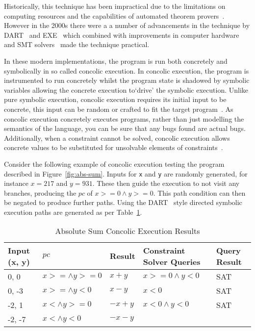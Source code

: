 \documentclass[]{final_report}
\begin{document}
Historically, this technique has been impractical due to the limitations on computing resources and the capabilities of automated theorem provers~\cite{king1976symbolic}. However in the 2000s there were a a number of advancements in the technique by DART~\cite{godefroid2005dart} and EXE~\cite{cadar2008exe} which combined with improvements in computer hardware and SMT solvers~\cite{de2011satisfiability} made the technique practical.

In these modern implementations, the program is run both concretely and symbolically in so called concolic execution. In concolic execution, the program is instrumented to run concretely whilst the program state is shadowed by symbolic variables allowing the concrete execution to`drive' the symbolic execution. Unlike pure symbolic execution, concolic execution requires its initial input to be concrete, this input can be random or crafted to fit the target program~\cite{godefroid2008grammar,cadar2013symbolic}. As concolic execution concretely executes programs, rather than just modelling the semantics of the language, you can be sure that any bugs found are actual bugs. Additionally, when a constraint cannot be solved, concolic execution allows concrete values to be substituted for unsolvable elements of constraints~\cite{sen2007concolic,sen2005cute}.

Consider the following example of concolic execution testing the program described in  Figure~\ref{fig:abs-sum}. Inputs for \lstinline{x} and \lstinline{y} are randomly generated, for instance $x=217$ and $y=931$. These then guide the execution to not visit any branches, producing the $pc$ of $x >= 0 \land y >=0$. This path condition can then be negated to produce further paths. Using the DART~\cite{godefroid2005dart} style directed symbolic execution paths are generated as per Table~\ref{abs-sum-ce-table}.

\begin{table}[]
\centering
\begin{tabular}{|l|l|l|l|l|}
\hline
Input (x, y) & $pc$ & Result & Constraint Solver Queries & Query Result \\ \hline
0, 0 & $x >= \land y >= 0$ & $x+y$ & $x >=0 \land y < 0 $ & SAT \\ \hline
0, -3 & $x >= \land y < 0$ & $x - y$ & $x <0 $ & SAT \\ \hline
-2, 1 & $x < \land y >= 0$ & $-x+y$ & $x<0 \land y < 0 $ & SAT \\ \hline
-2, -7 & $x < \land y < 0$ & $-x-y$ &  &  \\ \hline
\end{tabular}
\caption{Absolute Sum Concolic Execution Results}
\label{abs-sum-ce-table}
\end{table}
\end{document}
